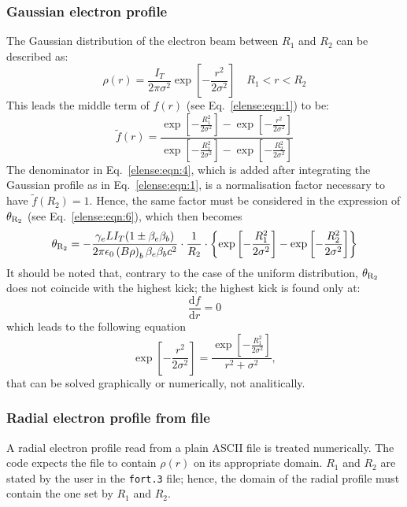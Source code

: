 \documentclass[english]{article}
\begin{document}
\subsubsection{Gaussian electron profile}
The Gaussian distribution of the electron beam between $R_1$ and $R_2$
can be described as:
\begin{equation}
\rho(r) = \frac{I_T}{2\pi\sigma^2} \exp\left[-\frac{r^2}{2\sigma^2}\right] \quad R_1 < r < R_2
\end{equation}
This leads the middle term of $f(r)$ (see Eq.~\ref{elense:eqn:1}) to be:
\begin{equation}
  \tilde f(r)=\frac{\exp\left[-\frac{R_1^2}{2\sigma^2}\right]-\exp\left[-\frac{r^2}{2\sigma^2}\right]}
                   {\exp\left[-\frac{R_1^2}{2\sigma^2}\right]-\exp\left[-\frac{R_2^2}{2\sigma^2}\right]}
  \label{elense:eqn:4}
\end{equation}
The denominator in Eq.~\ref{elense:eqn:4}, which is added after integrating
the Gaussian profile as in Eq.~\ref{elense:eqn:1}, is a normalisation factor
necessary to have $\tilde f(R_2)=1$. Hence, the same factor must be considered
in the expression of $\theta_{\rm R_2}$ (see Eq.~\ref{elense:eqn:6}), which then becomes
\begin{equation}
  \theta_{\rm R_2} = -\frac{\gamma_eLI_T(1\pm\beta_e\beta_b)}{2\pi\epsilon_0  \left(B\rho\right)_b\beta_e\beta_b c^2}\cdot\frac{1}{R_2}
  \cdot\left\{\exp\left[-\frac{R_1^2}{2\sigma^2}\right]-\exp\left[-\frac{R_2^2}{2\sigma^2}\right]\right\}
\end{equation}
It should be noted that, contrary to the case of the uniform distribution,
$\theta_{\rm R_2}$ does not coincide with the highest kick; the highest kick is
found only at:
\begin{equation}
  \frac{\textrm{d}f}{\textrm{d}r}=0
\end{equation}
which leads to the following equation
\begin{equation}
  \exp\left[-\frac{r^2}{2\sigma^2}\right] = \frac{\exp\left[-\frac{R_1^2}{2\sigma^2}\right]}{r^2+\sigma^2},
\end{equation}
that can be solved graphically or numerically, not analitically.

\subsubsection{Radial electron profile from file}
A radial electron profile read from a plain ASCII file is treated numerically.
The code expects the file to contain $\rho(r)$ on its appropriate domain.
$R_1$ and $R_2$ are stated by the user in the \texttt{fort.3} file; hence,
the domain of the radial profile must contain the one set by $R_1$ and $R_2$.
\end{document}
